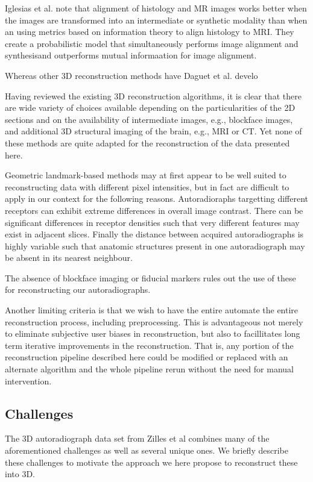 \documentclass[12pt]{article}
\begin{document}
Iglesias et al. \cite{Iglesias2018} note that alignment of histology and MR images works better when the images are transformed into an intermediate or synthetic modality than when an using metrics based on information theory to align histology to MRI. They create a probabilistic model that simultaneously performs image alignment and synthesisand outperforms mutual informaation for image alignment. 

Whereas other 3D reconstruction methods have Daguet et al. develo

Having reviewed the existing 3D reconstruction algorithms, it is clear that there are wide variety of choices available depending on the particularities of the 2D sections and on the availability of intermediate images, e.g., blockface images, and additional 3D structural imaging of the brain, e.g., MRI or CT. Yet none of these methods are quite adapted for the reconstruction of the data presented here.

Geometric landmark-based methods may at first appear to be well suited to reconstructing data with different pixel intensities, but in fact are difficult to apply in our context for the following reasons. Autoradioraphs targetting different receptors can exhibit extreme differences in overall image contrast. There can be significant differences in receptor densities such that very different features may exist in adjacent slices. Finally the distance between acquired autoradiographs is highly variable such that anatomic structures present in one autoradiograph may be absent in its nearest neighbour.

The absence of blockface imaging or fiducial markers rules out the use of these for reconstructing our autoradiographs.

Another limiting criteria is that we wish to have the entire automate the entire reconstruction process, including preprocessing. This is advantageous not merely to eliminate subjective user biases in reconstruction, but also to facillitates long term iterative improvements in the reconstruction. That is, any portion of the reconstruction pipeline described here could be modified or replaced with an alternate algorithm and the whole pipeline rerun without the need for manual intervention.


\subsection{Challenges}

The 3D autoradiograph data set from Zilles et al \cite{Zilles2002} combines many of the aforementioned challenges as well as several unique ones. We briefly describe these challenges to motivate the approach we here propose to reconstruct these into 3D. 
\end{document}

